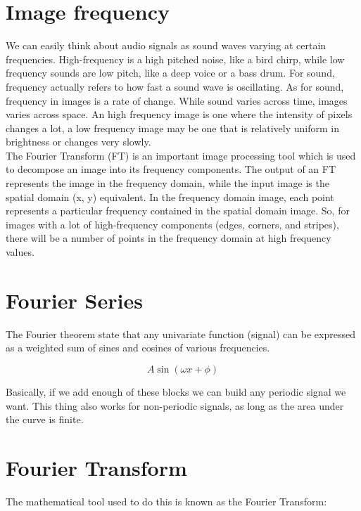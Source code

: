\documentclass{article}
\begin{document}
\newpage

\section*{Image frequency}

We can easily think about audio signals as sound waves varying at certain frequencies. High-frequency is a high pitched noise, like a bird chirp, while low frequency sounds are low pitch, like a deep voice or a bass drum. For sound, frequency actually refers to how fast a sound wave is oscillating. As for sound, frequency in images is a rate of change. While sound varies across time, images varies across space. An high frequency image is one where the intensity of pixels changes a lot, a low frequency image may be one that is relatively uniform in brightness or changes very slowly. \\

The Fourier Transform (FT) is an important image processing tool which is used to decompose an image into its frequency components. The output of an FT represents the image in the frequency domain, while the input image is the spatial domain (x, y) equivalent. In the frequency domain image, each point represents a particular frequency contained in the spatial domain image. So, for images with a lot of high-frequency components (edges, corners, and stripes), there will be a number of points in the frequency domain at high frequency values.

\section*{Fourier Series}

The Fourier theorem state that any univariate function (signal) can be expressed as a weighted sum of sines and cosines of various frequencies. 

\begin{equation*}
    A \sin(\omega x + \phi) 
\end{equation*}

Basically, if we add enough of these blocks we can build any periodic signal we want. This thing also works for non-periodic signals, as long as the area under the curve is finite.

\section*{Fourier Transform}

The mathematical tool used to do this is known as the Fourier Transform:
\end{document}
